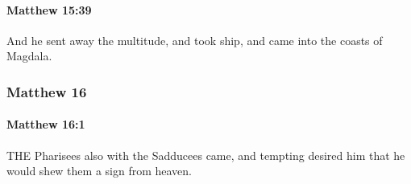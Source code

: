 		\paragraph{Matthew 15:39} %
			\label{MATTHEW-15-39}

			And he sent away the multitude, and took ship, and came into the coasts of Magdala.

			\begin{framed}
			\scriptsize
				\begin{compactdesc}
					\item[SBLG] 
				\end{compactdesc}
			\end{framed}

	\subsubsection{Matthew 16} %
		\label{MATTHEW-16}
		
		\paragraph{Matthew 16:1} %
			\label{MATTHEW-16-1}

			THE Pharisees also with the Sadducees came, and tempting desired him that he would shew them a sign from heaven.

